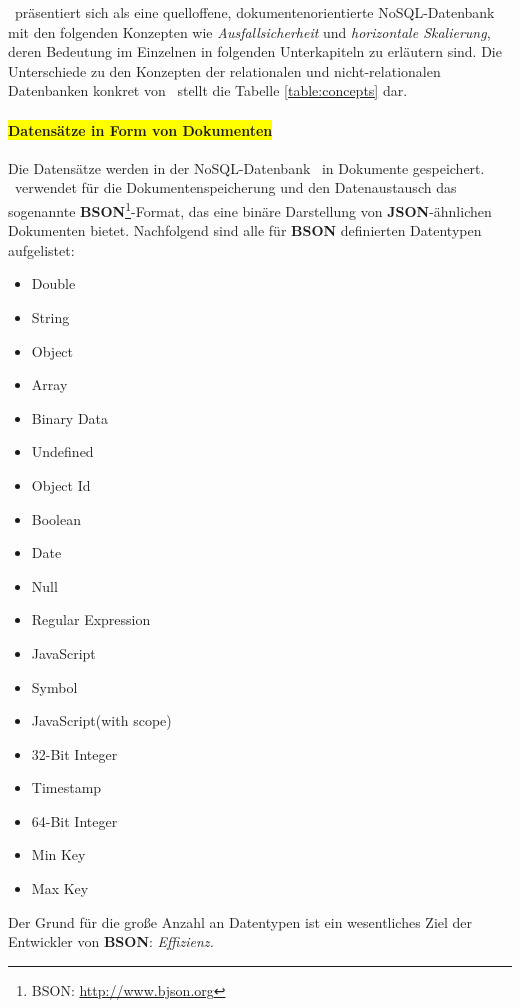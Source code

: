 \mongo\ präsentiert sich als eine quelloffene, dokumentenorientierte NoSQL-Datenbank mit den folgenden Konzepten wie \textit{Ausfallsicherheit} und \textit{horizontale Skalierung}, deren Bedeutung im Einzelnen in folgenden Unterkapiteln zu erläutern sind.
Die Unterschiede zu den Konzepten der relationalen und nicht-relationalen Datenbanken konkret von \mongo\ stellt die Tabelle \ref{table:concepts} dar.

\paragraph{\colorbox{yellow}{Datensätze in Form von Dokumenten}}
Die Datensätze werden in  der NoSQL-Datenbank \mongo\ in Dokumente gespeichert. \mongo\ verwendet für die Dokumentenspeicherung und den Datenaustausch das sogenannte \textbf{BSON}\footnote{BSON: \url{http://www.bjson.org}}-Format, das eine binäre Darstellung von \textbf{JSON}-ähnlichen Dokumenten bietet. Nachfolgend sind alle für \textbf{BSON} definierten Datentypen aufgelistet:
\begin{multicols}{3}
\begin{itemize}
\item Double
\item String
\item Object
\item Array
\item Binary Data
\item Undefined
\item Object Id
\item Boolean
\item Date
\item Null
\item Regular Expression
\item JavaScript
\item Symbol
\item JavaScript(with scope)
\item 32-Bit Integer
\item Timestamp
\item 64-Bit Integer
\item Min Key
\item Max Key
\end{itemize}
\end{multicols}
Der Grund für die große Anzahl an Datentypen ist ein wesentliches Ziel der Entwickler von \textbf{BSON}: \textit{Effizienz.}

